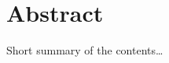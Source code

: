 

\begingroup
\let\clearpage\relax
\let\cleardoublepage\relax
\let\cleardoublepage\relax

\chapter*{Abstract} %

Short summary of the contents\dots

\endgroup			

\vfill
